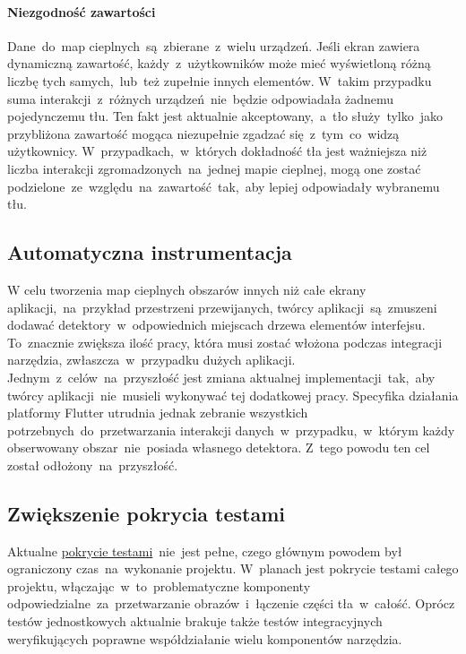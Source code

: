 \paragraph{Niezgodność zawartości}
Dane~do~map cieplnych~są~zbierane~z~wielu urządzeń. Jeśli ekran zawiera dynamiczną zawartość, każdy~z~użytkowników może mieć wyświetloną różną liczbę tych samych,~lub~też zupełnie innych elementów. W~takim przypadku suma interakcji~z~różnych urządzeń~nie~będzie odpowiadała żadnemu pojedynczemu tłu. Ten fakt jest aktualnie akceptowany,~a~tło służy~tylko~jako przybliżona zawartość mogąca niezupełnie zgadzać się~z~tym~co~widzą użytkownicy. W~przypadkach,~w~których dokładność tła jest ważniejsza niż liczba interakcji zgromadzonych~na~jednej mapie cieplnej, mogą one zostać podzielone~ze~względu~na~zawartość~tak,~aby lepiej odpowiadały wybranemu tłu.

\subsection{Automatyczna instrumentacja}
\label{sec:auto_instrumentation}
W celu tworzenia map cieplnych obszarów innych niż całe ekrany aplikacji,~na~przykład przestrzeni przewijanych, twórcy aplikacji~są~zmuszeni dodawać detektory~w~odpowiednich miejscach drzewa elementów interfejsu. To~znacznie zwiększa ilość pracy, która musi zostać włożona podczas integracji narzędzia, zwłaszcza~w~przypadku dużych aplikacji. Jednym~z~celów~na~przyszłość jest zmiana aktualnej implementacji~tak,~aby twórcy aplikacji~nie~musieli wykonywać tej dodatkowej pracy. Specyfika działania platformy Flutter utrudnia jednak zebranie wszystkich potrzebnych~do~przetwarzania interakcji danych~w~przypadku,~w~którym każdy obserwowany obszar~nie~posiada własnego detektora. Z~tego powodu ten cel został odłożony~na~przyszłość.

\subsection{Zwiększenie pokrycia testami}
\label{sec:future_coverage}
Aktualne \hyperref[par:test_coverage]{pokrycie testami}~nie~jest pełne, czego głównym powodem był ograniczony czas~na~wykonanie projektu. W~planach jest pokrycie testami całego projektu, włączając~w~to~problematyczne komponenty odpowiedzialne~za~przetwarzanie obrazów~i~łączenie części tła~w~całość. Oprócz testów jednostkowych aktualnie brakuje także testów integracyjnych weryfikujących poprawne współdziałanie wielu komponentów narzędzia.

